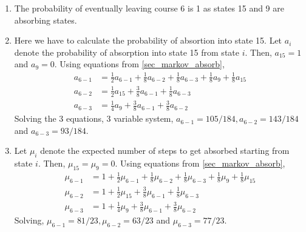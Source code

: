 \documentclass[../../probability-notes.tex]{subfile}
\begin{document}
        \begin{enumerate}
            \item The probability of eventually leaving course 6 is 1 as states 15 and 9 are absorbing states.
            \item \label{itm:a_markovcourse_2} Here we have to calculate the probability of absortion into state 15. Let $a_{i}$ denote the probability of absorption into state 15 from state $i$. Then, $a_{15} = 1$ and $a_{9} = 0$. Using equations from \ref{sec_markov_absorb},
            \begin{align*}
                a_{6-1} &= \frac{1}{2}a_{6-1} + \frac{1}{8} a_{6-2} + \frac{1}{8} a_{6-3} + \frac{1}{8}a_{9} + \frac{1}{8}a_{15}\\
                a_{6-2} &= \frac{1}{2}a_{15} + \frac{3}{8}a_{6-1} + \frac{1}{8}a_{6-3}\\
                a_{6-3} &= \frac{1}{4}a_{9} + \frac{3}{8}a_{6-1} + \frac{3}{8}a_{6-2}
            \end{align*}
            Solving the 3 equations, 3 variable system, $a_{6-1} = 105/184, a_{6-2} = 143/184$ and $a_{6-3} = 93/184$.
            \item Let $\mu_{i}$ denote the expected number of steps to get absorbed starting from state $i$. Then, $\mu_{15} = \mu_{9} = 0$. Using equations from \ref{sec_markov_absorb},
            \begin{align*}
                \mu_{6-1} &= 1 + \frac{1}{2}\mu_{6-1} + \frac{1}{8} \mu_{6-2} + \frac{1}{8} \mu_{6-3} + \frac{1}{8}\mu_{9} + \frac{1}{8}\mu_{15}\\
                \mu_{6-2} &= 1 + \frac{1}{2}\mu_{15} + \frac{3}{8}\mu_{6-1} + \frac{1}{8}\mu_{6-3}\\
                \mu_{6-3} &= 1 + \frac{1}{4}\mu_{9} + \frac{3}{8}\mu_{6-1} + \frac{3}{8}\mu_{6-2}                
            \end{align*}
            Solving, $\mu_{6-1} = 81/23, \mu_{6-2} = 63/23$ and $\mu_{6-3} = 77/23$.


\end{enumerate}
\end{document}
